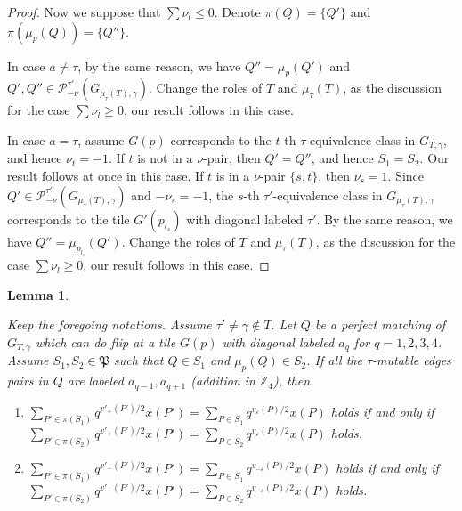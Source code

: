 \documentclass[10pt]{amsart}
\theoremstyle{theorems}
\newtheorem{Lemma}[Theorem]{Lemma}
\begin{document}
\begin{proof}
Now we suppose that $\sum\nu_l\leq 0$. Denote $\pi(Q)=\{Q'\}$ and $\pi(\mu_p(Q))=\{Q''\}$.

In case $a\neq \tau$, by the same reason, we have $Q''=\mu_{p}(Q')$ and $Q',Q''\in \mathcal P^{\tau'}_{-\nu}(G_{\mu_{\tau}(T),\gamma})$. Change the roles of $T$ and $\mu_{\tau}(T)$, as the discussion for the case $\sum\nu_l\geq 0$, our result follows in this case.

In case $a=\tau$, assume $G(p)$ corresponds to the $t$-th $\tau$-equivalence class in $G_{T,\gamma}$, and hence $\nu_t=-1$. If $t$ is not in a $\nu$-pair, then $Q'=Q''$, and hence $S_1=S_2$. Our result follows at once in this case. If $t$ is in a $\nu$-pair $\{s,t\}$, then $\nu_s=1$. Since $Q'\in \mathcal P^{\tau'}_{-\nu}(G_{\mu_{\tau}(T),\gamma})$ and $-\nu_s=-1$, the $s$-th $\tau'$-equivalence class in $G_{\mu_{\tau}(T),\gamma}$ corresponds to the tile $G'(p_{l_s})$ with diagonal labeled $\tau'$. By the same reason, we have $Q''=\mu_{p_{l_s}}(Q')$. Change the roles of $T$ and $\mu_{\tau}(T)$, as the discussion for the case $\sum\nu_l\geq 0$, our result follows in this case.
\end{proof}

\medskip

\begin{Lemma}\label{special-a}

Keep the foregoing notations. Assume $\tau'\neq\gamma\notin T$. Let $Q$ be a perfect matching of $G_{T,\gamma}$ which can do flip at a tile $G(p)$ with diagonal labeled $a_q$ for $q=1,2,3,4$. Assume $S_1,S_2\in \mathfrak P$ such that $Q\in S_1$ and $\mu_{p}(Q)\in S_2$. If all the $\tau$-mutable edges pairs in $Q$ are labeled $a_{q-1},a_{q+1}$ (addition in $\mathbb Z_4$), then

\begin{enumerate}[$(1)$]

  \item $\sum_{P'\in \pi(S_1)}q^{v'_{+}(P')/2}x(P')=\sum_{P\in S_1}q^{v_{\varepsilon}(P)/2}x(P)$ holds if and only if\\
   $\sum_{P'\in \pi(S_2)}q^{v'_{+}(P')/2}x(P')=\sum_{P\in S_2}q^{v_{\varepsilon}(P)/2}x(P)$ holds.

  \item $\sum_{P'\in \pi(S_1)}q^{v'_{-}(P')/2}x(P')=\sum_{P\in S_1}q^{v_{-\varepsilon}(P)/2}x(P)$ holds if and only if\\
   $\sum_{P'\in \pi(S_2)}q^{v'_{-}(P')/2}x(P')=\sum_{P\in S_2}q^{v_{-\varepsilon}(P)/2}x(P)$ holds.

\end{enumerate}

\end{Lemma}
\end{document}
